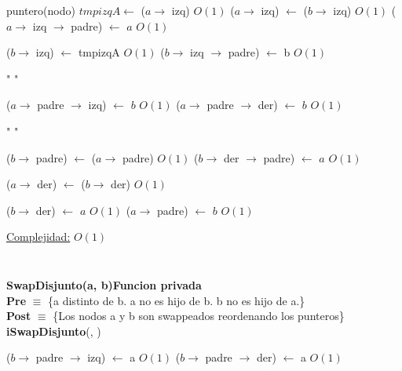 \begin{Algoritmos}
\begin{algorithm}[H]
\begin{algorithmic}[1]
    \State puntero(nodo) $tmpizqA \gets$ ($a \to$ izq) \Comment $O(1)$
    \State ($a \to$ izq) $\gets$ ($b \to$ izq)  \Comment $O(1)$
        \State ($a \to$ izq $\to$ padre) $\gets$ $a$ \Comment $O(1)$
    \EndIf

    \State ($b \to$ izq) $\gets$ tmpizqA  \Comment $O(1)$
        \State ($b \to$ izq $\to$ padre) $\gets$ b  \Comment $O(1)$
    \EndIf
    
    \State " "

        \State ($a \to$ padre $\to$ izq) $\gets$ $b$ \Comment $O(1)$
    \Else {}
        \State ($a \to$ padre $\to$ der) $\gets$ $b$ \Comment $O(1)$
    \EndIf
    \EndIf
    
    \State " "

    \State ($b \to$ padre) $\gets$ ($a \to$ padre) \Comment $O(1)$
        \State ($b \to$ der $\to$ padre) $\gets$ $a$ \Comment $O(1)$
    \EndIf
    
    \State ($a \to$ der) $\gets$ ($b \to$ der) \Comment $O(1)$
    
    \State ($b \to$ der) $\gets$ $a$ \Comment $O(1)$
    \State ($a \to$ padre) $\gets$ $b$ \Comment $O(1)$

    \medskip
    \Statex \underline{Complejidad:} $O(1)$

\end{algorithmic}
\end{algorithm}

$ $\newline


$ $\newline

\begin{algorithm}[H]
\textbf{SwapDisjunto(a, b)\hspace*{1cm}Funcion privada}\\
\textbf{Pre} $\equiv$ \{a distinto de b. a no es hijo de b. b no es hijo de a.\}\\
\textbf{Post} $\equiv$ \{Los nodos a y b son swappeados reordenando los punteros\}\\
{\textbf{iSwapDisjunto}(, )}
\begin{algorithmic}[1]

        \State ($b \to$ padre $\to$ izq) $\gets$ a \Comment $O(1)$
    \Else {}
        \State ($b \to$ padre $\to$ der) $\gets$ a \Comment $O(1)$
    \EndIf
    \EndIf


\end{algorithmic}
\end{algorithm}
\end{Algoritmos}
